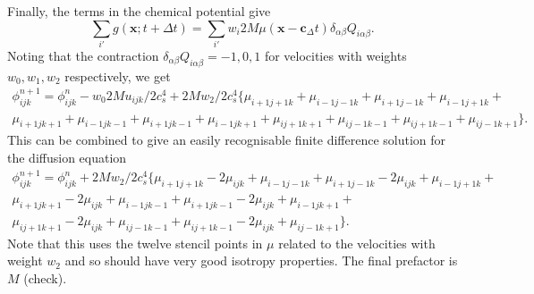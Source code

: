 Finally, the terms in the chemical potential give
\begin{equation}
\sum_{i'} g(\mathbf{x};t + \Delta t) =
\sum_{i'} w_i 2M\mu(\mathbf{x} - \mathbf{c}_ \Delta t)
\delta_{\alpha\beta} Q_{i\alpha\beta}.
\end{equation}
Noting that the contraction $\delta_{\alpha\beta} Q_{i\alpha\beta} =
-1, 0, 1$ for velocities with weights $w_0, w_1, w_2$ respectively,
we get
\begin{eqnarray}
\phi_{ijk}^{n+1} = \phi_{ijk}^n -  w_0 2M u_{ijk}/2c_s^4
+ 2M w_2/2c_s^4 \Big\{
\mu_{i+1 j+1 k} + \mu_{i-1 j-1 k} + \mu_{i+1 j-1 k} + \mu_{i-1 j+1 k} + \\
\mu_{i+1 j k+1} + \mu_{i-1 j k-1} + \mu_{i+1 j k-1} + \mu_{i-1 j k+1} +
\mu_{i j+1 k+1} + \mu_{i j-1 k-1} + \mu_{i j+1 k-1} + \mu_{i j-1 k+1} \Big\}.
\end{eqnarray}
This can be combined to give an easily recognisable finite difference
solution for the diffusion equation
\begin{eqnarray}
\phi_{ijk}^{n+1} = \phi_{ijk}^n + 2M w_2 / 2 c_s^4
\Big\{
\mu_{i+1 j+1 k} - 2\mu_{ijk} + \mu_{i-1 j-1 k} + 
\mu_{i+1 j-1 k} - 2\mu_{ijk} + \mu_{i-1 j+1 k} + \\
\mu_{i+1 j k+1} - 2\mu_{ijk} + \mu_{i-1 j k-1} +
\mu_{i+1 j k-1} - 2\mu_{ijk} + \mu_{i-1 j k+1} + \\
\mu_{i j+1 k+1} - 2\mu_{ijk} + \mu_{i j-1 k-1} + 
\mu_{i j+1 k-1} - 2\mu_{ijk} + \mu_{i j-1 k+1} \Big\}.
\end{eqnarray}
Note that this uses the twelve stencil points in $\mu$ related to
the velocities with weight $w_2$ and so should have very good isotropy
properties. The final prefactor is $M$ (check).